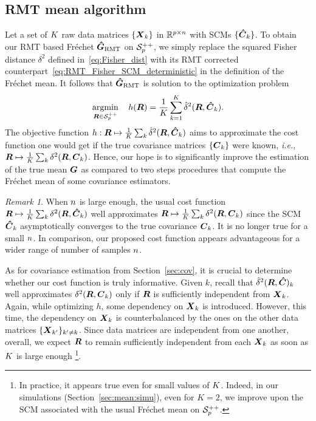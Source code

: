 \documentclass{article}
\theoremstyle{plain}
\theoremstyle{definition}
\theoremstyle{remark}
\newtheorem{remark}[theorem]{Remark}
\begin{document}
\subsection{RMT mean algorithm}
\label{sec:mean:algo}
Let a set of $K$ raw data matrices $\{\boldsymbol{X}_k\}$ in $\mathbb{R}^{p\times n}$ with SCMs $\{\boldsymbol{\hat{C}}_k\}$.
To obtain our RMT based Fréchet $\boldsymbol{\hat{G}}_{\textup{RMT}}$ on $\mathcal{S}^{++}_{p}$, we simply replace the squared Fisher distance $\delta^2$ defined in~\eqref{eq:Fisher_dist} with its RMT corrected counterpart~\eqref{eq:RMT_Fisher_SCM_deterministic} in the definition of the Fréchet mean.
It follows that $\boldsymbol{\hat{G}}_{\textup{RMT}}$ is solution to the optimization problem
\begin{equation}
    \operatorname*{argmin}_{\boldsymbol{R}\in\mathcal{S}^{++}_{p}} \quad h(\boldsymbol{R}) = \frac1{K}\sum_{k=1}^{K} \hat{\delta}^2(\boldsymbol{R},\boldsymbol{\hat{C}}_k).
\label{eq:RMT_mean_optim_problem}
\end{equation}
The objective function $h:\boldsymbol{R}\mapsto\frac1{K}\sum_k\hat{\delta}^2(\boldsymbol{R},\boldsymbol{\hat{C}}_k)$ aims to approximate the cost function one would get if the true covariance matrices $\{\boldsymbol{C}_k\}$ were known, \emph{i.e.}, $\boldsymbol{R}\mapsto\frac1{K}\sum_k\delta^2(\boldsymbol{R},\boldsymbol{C}_k)$.
Hence, our hope is to significantly improve the estimation of the true mean $\boldsymbol{G}$ as compared to two steps procedures that compute the Fréchet mean of some covariance estimators.
%
\begin{remark}
    When $n$ is large enough, the usual cost function $\boldsymbol{R}\mapsto\frac1{K}\sum_k\delta^2(\boldsymbol{R},\boldsymbol{\hat{C}}_k)$ well approximates $\boldsymbol{R}\mapsto\frac1{K}\sum_k\delta^2(\boldsymbol{R},\boldsymbol{C}_k)$ since the SCM $\boldsymbol{\hat{C}}_k$ asymptotically converges to the true covariance $\boldsymbol{C}_k$.
    It is no longer true for a small $n$.
    In comparison, our proposed cost function appears advantageous for a wider range of number of samples $n$.
\end{remark}

As for covariance estimation from Section~\ref{sec:cov}, it is crucial to determine whether our cost function is truly informative.
Given $k$, recall that $\hat{\delta}^2(\boldsymbol{R},\boldsymbol{\hat{C}})_k$ well approximates $\delta^2(\boldsymbol{R},\boldsymbol{C}_k)$ only if $\boldsymbol{R}$ is sufficiently independent from $\boldsymbol{X}_k$.
Again, while optimizing $h$, some dependency on $\boldsymbol{X}_k$ is introduced.
However, this time, the dependency on $\boldsymbol{X}_k$ is counterbalanced by the ones on the other data matrices $\{\boldsymbol{X}_{k'}\}_{k'\neq k}$.
Since data matrices are independent from one another, overall, we expect $\boldsymbol{R}$ to remain sufficiently independent from each $\boldsymbol{X}_k$ as soon as $K$ is large enough%
\footnote{
    In practice, it appears true even for small values of $K$.
    Indeed, in our simulations (Section~\ref{sec:mean:simu}), even for $K=2$, we improve upon the SCM associated with the usual Fréchet mean on $\mathcal{S}^{++}_{p}$.
}.
\end{document}
